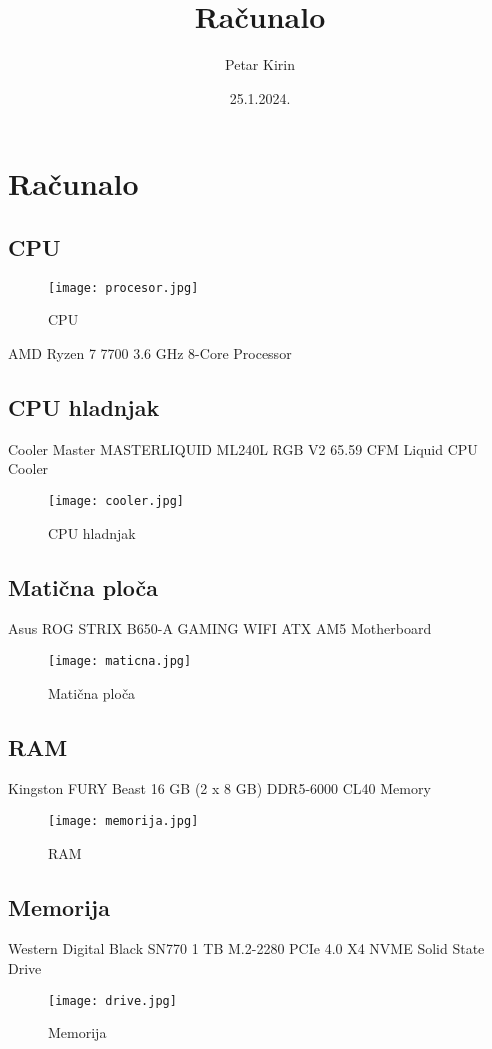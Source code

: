 \documentclass{report}
\title{Računalo}
\author{Petar Kirin}
\date{25.1.2024.}
\begin{document}
\maketitle
\tableofcontents
\listoffigures
\chapter{Računalo}

\section{CPU}
\begin{figure}[h]
    \texttt{[image: procesor.jpg]}
    \caption{CPU}
\end{figure}
AMD Ryzen 7 7700 3.6 GHz 8-Core Processor

\section{CPU hladnjak}
Cooler Master MASTERLIQUID ML240L RGB V2 65.59 CFM Liquid CPU Cooler
\begin{figure}[h]
    \texttt{[image: cooler.jpg]}
    \caption{CPU hladnjak}
\end{figure}

\section{Matična ploča}
Asus ROG STRIX B650-A GAMING WIFI ATX AM5 Motherboard

\begin{figure}[h]
    \texttt{[image: maticna.jpg]}
    \caption{Matična ploča}
\end{figure}

\section{RAM}
Kingston FURY Beast 16 GB (2 x 8 GB) DDR5-6000 CL40 Memory
\begin{figure}[h]
    \texttt{[image: memorija.jpg]}
    \caption{RAM}
\end{figure}

\section{Memorija}
Western Digital Black SN770 1 TB M.2-2280 PCIe 4.0 X4 NVME Solid State Drive
\begin{figure}[h]
    \texttt{[image: drive.jpg]}
    \caption{Memorija}
\end{figure}
\end{document}

